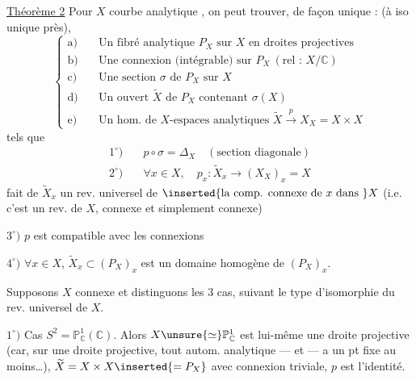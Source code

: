 \uline{Théorème 2} Pour $X$ courbe analytique , on peut trouver, de façon unique :
(à iso unique près),
\[
\left\{\begin{aligned}
\text{a)}\quad&\text{Un fibré analytique }P_X\text{ sur }X\text{ en droites projectives}\\
\text{b)}\quad&\text{Une connexion (intégrable) sur }P_X\ (\text{rel : }X/\mathbb C)\\
\text{c)}\quad&\text{Une section }\sigma\text{ de }P_X\text{ sur }X\\
\text{d)}\quad&\text{Un ouvert }\widetilde X\text{ de }P_X\text{ contenant }\sigma(X)\\
\text{e)}\quad&\text{Un hom. de }X\text{-espaces analytiques }\widetilde X\xrightarrow{p}X_X=X\times X
\end{aligned}\right.
\]
tels que
\[
\begin{aligned}
1^\circ)\quad&p\circ\sigma=\Delta_X\quad(\text{section diagonale})\\
2^\circ)\quad&\forall x\in X,\quad p_x:\widetilde X_x\longrightarrow(X_X)_x=X
\end{aligned}
\]
fait de $\widetilde X_x$ un rev. universel de $\inserted{\text{la comp. connexe de }x\text{ dans }}X$ (i.e. c'est un rev. de $X$, connexe et simplement connexe)

$3^\circ)$ $p$ est compatible avec les connexions

$4^\circ)$ $\forall x\in X$, $\widetilde X_x\subset(P_X)_x$ est un domaine homogène de $(P_X)_x$.

Supposons $X$ connexe et distinguons les 3 cas, suivant le type d'isomorphie du rev. universel de $X$.

$1^\circ)$ Cas $S^2=\mathbb P^1_{\mathbb C}(\mathbb C)$. Alors $X\unsure{\simeq}\mathbb P^1_{\mathbb C}$ est lui-même une droite projective (car, sur une droite projective, tout autom. analytique --- et  --- a un pt fixe au moins\ldots), $\widetilde X=X\times X\inserted{=P_X}$ avec connexion triviale, $p$ est l'identité.

